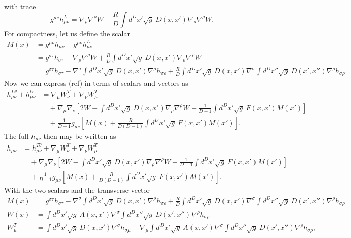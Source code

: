 \documentclass[10pt,letterpaper]{article}
\begin{document}
with trace
\begin{equation}
g^{\mu\nu}h_{\mu\nu}^L = \nabla_\rho \nabla^\rho W - \frac{R}{D}\int d^Dx' \sqrt g\ D(x,x') \nabla_\rho \nabla^\rho W.
\end{equation}
For compactness, let us define the scalar
\begin{align}
M(x)  &= g^{\mu\nu}h_{\mu\nu} - g^{\mu\nu}h_{\mu\nu}^L 
\nonumber\\
&= g^{\sigma\tau}h_{\sigma\tau} -  \nabla_\rho \nabla^\rho W + \frac{R}{D}\int d^Dx' \sqrt g\ D(x,x') \nabla_\rho \nabla^\rho W
\nonumber\\
&= g^{\sigma\tau}h_{\sigma\tau} - \nabla^\sigma \int d^Dx' \sqrt{g}\ D(x,x') \nabla^\rho h_{\sigma\rho}
 +\frac{R}{D}\int d^Dx' \sqrt g\ D(x,x') \nabla^\sigma \int d^Dx'' \sqrt{g}\ D(x',x'') \nabla^\rho h_{\sigma\rho}.
\end{align}
Now we can express (ref) in terms of scalars and vectors as
\begin{align}
h_{\mu\nu}^{L\theta} + h^{tr}_{\mu\nu} &=\nabla_\mu W^T_\nu + \nabla_\nu W^T_\mu
\nonumber\\
 &\quad+ \nabla_\mu\nabla_\nu \left[ 2W- \int d^Dx' \sqrt{g}\ D(x,x')\nabla_\rho \nabla^\rho W - \frac{1}{D-1} \int  d^Dx' \sqrt{g}\ F(x,x') M(x')\right]
\nonumber\\
&\quad +\frac{1}{D-1} g_{\mu\nu}\left[ M(x) + \frac{R}{D(D-1)} \int   d^Dx' \sqrt{g}\ F(x,x') M(x') \right].
\end{align}
The full $h_{\mu\nu}$ then may be written as
\begin{align}
h_{\mu\nu} &=h_{\mu\nu}^{T\theta} + \nabla_\mu W^T_\nu + \nabla_\nu W^T_\mu
\nonumber\\
 &\quad+ \nabla_\mu\nabla_\nu \left[ 2W- \int d^Dx' \sqrt{g}\ D(x,x')\nabla_\rho \nabla^\rho W - \frac{1}{D-1} \int  d^Dx' \sqrt{g}\ F(x,x') M(x')\right]
\nonumber\\
&\quad +\frac{1}{D-1} g_{\mu\nu}\left[ M(x) + \frac{R}{D(D-1)} \int   d^Dx' \sqrt{g}\ F(x,x') M(x') \right].
\end{align}
With the two scalars and the transverse vector
\begin{align}
M(x) &=  g^{\sigma\tau}h_{\sigma\tau} - \nabla^\sigma \int d^Dx' \sqrt{g}\ D(x,x') \nabla^\rho h_{\sigma\rho}
 +\frac{R}{D}\int d^Dx' \sqrt g\ D(x,x') \nabla^\sigma \int d^Dx'' \sqrt{g}\ D(x',x'') \nabla^\rho h_{\sigma\rho}
\nonumber\\
W(x) &=  \int d^Dx' \sqrt{g}\ A(x,x') \nabla^\sigma  \int   d^Dx'' \sqrt{g}\ D(x',x'') \nabla^\rho h_{\sigma\rho}
\nonumber\\
W^T_\mu &= \int d^Dx' \sqrt{g}\ D(x,x')\nabla^\sigma h_{\sigma\mu} - \nabla_\mu \int d^Dx' \sqrt{g}\ A(x,x')
\nabla^\sigma \int d^Dx'' \sqrt{g}\ D(x',x'') \nabla^\rho h_{\sigma\rho},
\end{align}
\end{document}

